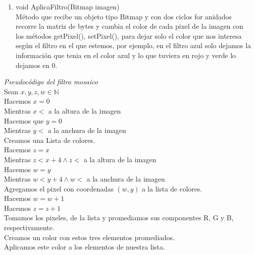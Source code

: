 \documentclass[12pt]{article}
\begin{document}
\begin{enumerate}
\begin{enumerate}
	\item void AplicaFiltro(Bitmap imagen)\\
		Método que recibe un objeto tipo Bitmap y con dos ciclos for anidados recorre la matriz de bytes y cambia el color de cada pixel de la imagen con los métodos getPixel(), setPixel(), para dejar solo el color que nos interesa según el filtro en el que estemos, por ejemplo, en el filtro azul solo dejamos la información que tenia en el color azul y lo que tuviera en rojo y verde lo dejamos en 0.
	\end{enumerate}	
	{\it Pseudocódigo del filtro mosaico}\\
	Sean $x, y, z, w \in \mathbb{N}$\\
	Hacemos $x = 0$\\
	Mientras $x <$ a la altura de la imagen\\
	\hspace*{1cm} Hacemos que $y = 0$\\
	\hspace*{1cm} Mientras $y <$ a la anchura de la imagen\\
		\hspace*{2cm}	Creamos una Lista de colores.\\
		\hspace*{2cm}	Hacemos $z = x$\\
		\hspace*{2cm}   Mientras $z < x + 4 \wedge z <$ a la altura de la imagen\\
			\hspace*{3cm}Hacemos $w = y$\\
				\hspace*{3cm}Mientras $w < y +4 \wedge w <$ a la anchura de la imagen\\
				\hspace*{3cm}Agregamos el pixel con coordenadas $(w, y)$ a la lista de colores.\\
				\hspace*{3cm}Hacemos $w = w + 1$\\
			\hspace*{2cm}Hacemos $z = z + 1$\\ 
			\hspace*{2cm}Tomamos los pixeles, de la lista y promediamos sus componentes R, G y B, respectivamente.\\
			\hspace*{2cm}Creamos un color con estos tres elementos promediados.\\
			\hspace*{2cm}Aplicamos este color a los elementos de nuestra lista.\\

\end{enumerate}
\end{document}
